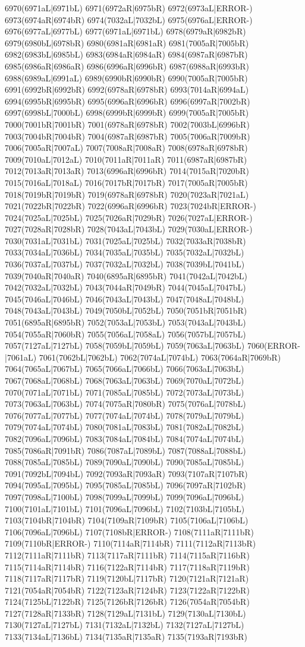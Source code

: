6970(6971aL|6971bL) 6971(6972aR|6975bR) 6972(6973aL|ERROR-) 6973(6974aR|6974bR) 6974(7032aL|7032bL) 6975(6976aL|ERROR-) 6976(6977aL|6977bL) 6977(6971aL|6971bL) 6978(6979aR|6982bR) 6979(6980bL|6978bR) 6980(6981aR|6981aR) 6981(7005aR|7005bR) 6982(6983bL|6985bL) 6983(6984aR|6984aR) 6984(6987aR|6987bR) 6985(6986aR|6986aR) 6986(6996aR|6996bR) 6987(6988aR|6993bR) 6988(6989aL|6991aL) 6989(6990bR|6990bR) 6990(7005aR|7005bR) 6991(6992bR|6992bR) 6992(6978aR|6978bR) 6993(7014aR|6994aL) 6994(6995bR|6995bR) 6995(6996aR|6996bR) 6996(6997aR|7002bR) 6997(6998bL|7000bL) 6998(6999bR|6999bR) 6999(7005aR|7005bR) 7000(7001bR|7001bR) 7001(6978aR|6978bR) 7002(7003bL|6996bR) 7003(7004bR|7004bR) 7004(6987aR|6987bR) 7005(7006aR|7009bR) 7006(7005aR|7007aL) 7007(7008aR|7008aR) 7008(6978aR|6978bR) 7009(7010aL|7012aL) 7010(7011aR|7011aR) 7011(6987aR|6987bR) 7012(7013aR|7013aR) 7013(6996aR|6996bR) 7014(7015aR|7020bR) 7015(7016aL|7018aL) 7016(7017bR|7017bR) 7017(7005aR|7005bR) 7018(7019bR|7019bR) 7019(6978aR|6978bR) 7020(7023aR|7021aL) 7021(7022bR|7022bR) 7022(6996aR|6996bR) 7023(7024bR|ERROR-) 7024(7025aL|7025bL) 7025(7026aR|7029bR) 7026(7027aL|ERROR-) 7027(7028aR|7028bR) 7028(7043aL|7043bL) 7029(7030aL|ERROR-) 7030(7031aL|7031bL) 7031(7025aL|7025bL) 7032(7033aR|7038bR) 7033(7034aL|7036bL) 7034(7035aL|7035bL) 7035(7032aL|7032bL) 7036(7037aL|7037bL) 7037(7032aL|7032bL) 7038(7039bL|7041bL) 7039(7040aR|7040aR) 7040(6895aR|6895bR) 7041(7042aL|7042bL) 7042(7032aL|7032bL) 7043(7044aR|7049bR) 7044(7045aL|7047bL) 7045(7046aL|7046bL) 7046(7043aL|7043bL) 7047(7048aL|7048bL) 7048(7043aL|7043bL) 7049(7050bL|7052bL) 7050(7051bR|7051bR) 7051(6895aR|6895bR) 7052(7053aL|7053bL) 7053(7043aL|7043bL) 7054(7055aR|7060bR) 7055(7056aL|7058aL) 7056(7057bL|7057bL) 7057(7127aL|7127bL) 7058(7059bL|7059bL) 7059(7063aL|7063bL) 7060(ERROR-|7061aL) 7061(7062bL|7062bL) 7062(7074aL|7074bL) 7063(7064aR|7069bR) 7064(7065aL|7067bL) 7065(7066aL|7066bL) 7066(7063aL|7063bL) 7067(7068aL|7068bL) 7068(7063aL|7063bL) 7069(7070aL|7072bL) 7070(7071aL|7071bL) 7071(7085aL|7085bL) 7072(7073aL|7073bL) 7073(7063aL|7063bL) 7074(7075aR|7080bR) 7075(7076aL|7078bL) 7076(7077aL|7077bL) 7077(7074aL|7074bL) 7078(7079aL|7079bL) 7079(7074aL|7074bL) 7080(7081aL|7083bL) 7081(7082aL|7082bL) 7082(7096aL|7096bL) 7083(7084aL|7084bL) 7084(7074aL|7074bL) 7085(7086aR|7091bR) 7086(7087aL|7089bL) 7087(7088aL|7088bL) 7088(7085aL|7085bL) 7089(7090aL|7090bL) 7090(7085aL|7085bL) 7091(7092bL|7094bL) 7092(7093aR|7093aR) 7093(7107aR|7107bR) 7094(7095aL|7095bL) 7095(7085aL|7085bL) 7096(7097aR|7102bR) 7097(7098aL|7100bL) 7098(7099aL|7099bL) 7099(7096aL|7096bL) 7100(7101aL|7101bL) 7101(7096aL|7096bL) 7102(7103bL|7105bL) 7103(7104bR|7104bR) 7104(7109aR|7109bR) 7105(7106aL|7106bL) 7106(7096aL|7096bL) 7107(7108bR|ERROR-) 7108(7111aR|7111bR) 7109(7110bR|ERROR-) 7110(7114aR|7114bR) 7111(7112aR|7113bR) 7112(7111aR|7111bR) 7113(7117aR|7111bR) 7114(7115aR|7116bR) 7115(7114aR|7114bR) 7116(7122aR|7114bR) 7117(7118aR|7119bR) 7118(7117aR|7117bR) 7119(7120bL|7117bR) 7120(7121aR|7121aR) 7121(7054aR|7054bR) 7122(7123aR|7124bR) 7123(7122aR|7122bR) 7124(7125bL|7122bR) 7125(7126bR|7126bR) 7126(7054aR|7054bR) 7127(7128aR|7133bR) 7128(7129aL|7131bL) 7129(7130aL|7130bL) 7130(7127aL|7127bL) 7131(7132aL|7132bL) 7132(7127aL|7127bL) 7133(7134aL|7136bL) 7134(7135aR|7135aR) 7135(7193aR|7193bR) 